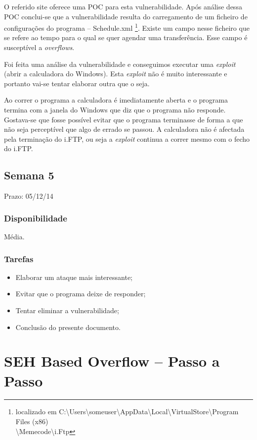 \documentclass[a4paper]{article}
\begin{document}
O referido site oferece uma POC para esta vulnerabilidade. Após análise dessa POC conclui-se que a vulnerabilidade resulta do carregamento de um ficheiro de configurações do programa -- Schedule.xml \footnote{localizado em C:\textbackslash Users\textbackslash someuser\textbackslash AppData\textbackslash Local\textbackslash VirtualStore\textbackslash Program Files (x86)\\ \textbackslash Memecode\textbackslash i.Ftp}. Existe um campo nesse ficheiro que se refere ao tempo para o qual se quer agendar uma transferência. Esse campo é susceptível a \textit{overflows}.

Foi feita uma análise da vulnerabilidade e conseguimos executar uma \textit{exploit} (abrir a calculadora do Windows). Esta \textit{exploit} não é muito interessante e portanto vai-se tentar elaborar outra que o seja.

Ao correr o programa a calculadora é imediatamente aberta e o programa termina com a janela do Windows que diz que o programa não responde. Gostava-se que fosse possível evitar que o programa terminasse de forma a que não seja perceptível que algo de errado se passou. A calculadora não é afectada pela terminação do i.FTP, ou seja a \textit{exploit} continua a correr mesmo com o fecho do i.FTP.


\subsection{Semana 5}
Prazo: 05/12/14
\subsubsection{Disponibilidade}
Média.
\subsubsection{Tarefas}
\begin{itemize}
	\item Elaborar um ataque mais interessante;
	\item Evitar que o programa deixe de responder;
	\item Tentar eliminar a vulnerabilidade;
	\item Conclusão do presente documento.
\end{itemize}


\section{SEH Based Overflow -- Passo a Passo}
\end{document}
